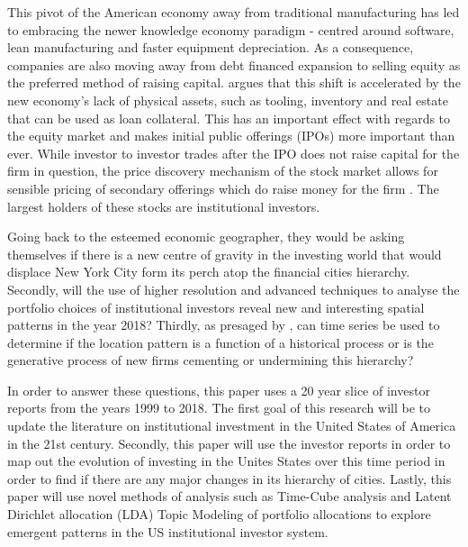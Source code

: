 This pivot of the American economy away from traditional manufacturing has led to embracing the newer knowledge economy paradigm - centred around software, lean manufacturing and faster equipment depreciation.  As a consequence, companies are also moving away from debt financed expansion to selling equity as the preferred method of raising capital. 	\cite{Graves2003} argues that this shift is accelerated by the new economy's lack of physical assets, such as tooling, inventory and real estate that can be used as loan collateral. This has an important effect with regards to the equity market and makes initial public offerings (IPOs) more important than ever. While investor to investor trades after the IPO does not raise capital for the firm in question, the price discovery mechanism of the stock market allows for sensible pricing of secondary offerings which do raise money for the firm \citep{Tobin1969}. The largest holders of these stocks are institutional investors.

Going back to the esteemed economic geographer, they would be asking themselves if there is a new centre of gravity in the investing world that would displace New York City form its perch atop the financial cities hierarchy.  Secondly, will the use of higher resolution and advanced techniques to analyse the portfolio choices of institutional investors reveal new and interesting spatial patterns in the year 2018?  Thirdly, as presaged by \cite{GreenOLef2014}, can time series be used to determine if the location pattern is a function of a historical process or is the generative process of new firms cementing or undermining this hierarchy?

In order to answer these questions, this paper uses a 20 year slice of investor reports from the years 1999 to 2018.  The first goal of this research will be to update the literature on institutional investment in the United States of America in the 21st century.  Secondly, this paper will use the investor reports in order to map out the evolution of investing in the Unites States over this time period in order to find if there are any major changes in its hierarchy of cities.  Lastly, this paper will use novel methods of analysis such as Time-Cube analysis and Latent Dirichlet allocation (LDA) Topic Modeling of portfolio allocations to explore emergent patterns in the US institutional investor system.  